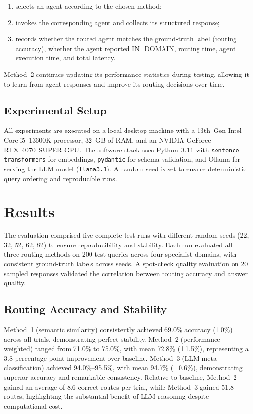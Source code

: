 \documentclass[11pt]{article}
\begin{document}
\begin{enumerate}
    \item selects an agent according to the chosen method;
    \item invokes the corresponding agent and collects its structured response;
    \item records whether the routed agent matches the ground-truth label (routing accuracy), whether the agent reported IN\_DOMAIN, routing time, agent execution time, and total latency.
\end{enumerate}

Method~2 continues updating its performance statistics during testing, allowing it to learn from agent responses and improve its routing decisions over time.

\subsection{Experimental Setup}

All experiments are executed on a local desktop machine with a 13th~Gen Intel Core i5--13600K processor, 32~GB of RAM, and an NVIDIA GeForce RTX~4070~SUPER GPU. The software stack uses Python~3.11 with \texttt{sentence-transformers} for embeddings, \texttt{pydantic} for schema validation, and Ollama for serving the LLM model (\texttt{llama3.1}). A random seed is set to ensure deterministic query ordering and reproducible runs.

\section{Results}

The evaluation comprised five complete test runs with different random seeds (22, 32, 52, 62, 82) to ensure reproducibility and stability. Each run evaluated all three routing methods on 200 test queries across four specialist domains, with consistent ground-truth labels across seeds. A spot-check quality evaluation on 20 sampled responses validated the correlation between routing accuracy and answer quality.

\subsection{Routing Accuracy and Stability}

Method~1 (semantic similarity) consistently achieved 69.0\% accuracy (±0\%) across all trials, demonstrating perfect stability. Method~2 (performance-weighted) ranged from 71.0\% to 75.0\%, with mean 72.8\% (±1.5\%), representing a 3.8 percentage-point improvement over baseline. Method~3 (LLM meta-classification) achieved 94.0\%--95.5\%, with mean 94.7\% (±0.6\%), demonstrating superior accuracy and remarkable consistency. Relative to baseline, Method~2 gained an average of 8.6 correct routes per trial, while Method~3 gained 51.8 routes, highlighting the substantial benefit of LLM reasoning despite computational cost.
\end{document}
